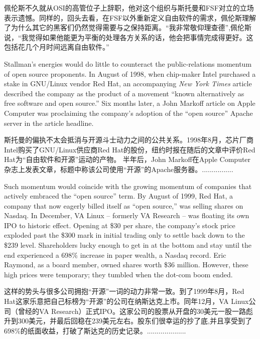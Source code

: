 \ifdefined\chs
佩伦斯不久就从OSI的高管位子上辞职，他对这个组织与斯托曼和FSF对立的立场表示遗憾。同样的，回头去看，在FSF以外重新定义自由软件的需求，佩伦斯理解了为什么其它的黑客们仍然觉得需要与之保持距离。``我非常敬仰理查德'',佩伦斯说，``我觉得如果他能更为平衡的处理各方关系的话，他会把事情完成得更好。这包括花几个月时间远离自由软件。''
\fi

\ifdefined\eng
Stallman's energies would do little to counteract the public-relations momentum of open source proponents. In August of 1998, when chip-maker Intel purchased a stake in GNU/Linux vendor Red Hat, an accompanying \textit{New York Times} article described the company as the product of a movement ``known alternatively as free software and open source.'' Six months later, a John Markoff article on Apple Computer was proclaiming the company's adoption of the ``open source'' Apache server in the article headline.
\fi

\ifdefined\chs
斯托曼的偏执不太会抵消与开源斗士动力之间的公共关系。1998年8月，芯片厂商Intel购买了GNU/Linux供应商Red Hat的股份，纽约时报在随后的文章中评价Red Hat为``自由软件和开源''运动的产物。 半年后，John Markoff在Apple Computer杂志上发表文章，标题中称该公司使用``开源''的Apache服务器。................
\fi

\ifdefined\eng
Such momentum would coincide with the growing momentum of companies that actively embraced the ``open source'' term. By August of 1999, Red Hat, a company that now eagerly billed itself as ``open source,'' was selling shares on Nasdaq. In December, VA Linux -- formerly VA Research -- was floating its own IPO to historic effect. Opening at \$30 per share, the company's stock price exploded past the \$300 mark in initial trading only to settle back down to the \$239 level. Shareholders lucky enough to get in at the bottom and stay until the end experienced a 698\% increase in paper wealth, a Nasdaq record.  Eric Raymond, as a board member, owned shares worth \$36 million.  However, these high prices were temporary; they tumbled when the dot-com boom ended.
\fi

\ifdefined\chs
这样的势头与很多公司拥抱``开源''一词的动力非常一致。到了1999年8月，Red Hat这家乐意把自己标榜为``开源''的公司在纳斯达克上市。同年12月，VA Linux公司（曾经的VA Research）正式IPO。这家公司的股票从开盘的30美元一股一路彪升到300美元，并最后回稳在239美元左右。股东们很幸运的抄了底,并且享受到了698\%的纸面收益，打破了斯达克的历史记录。....................
\fi

